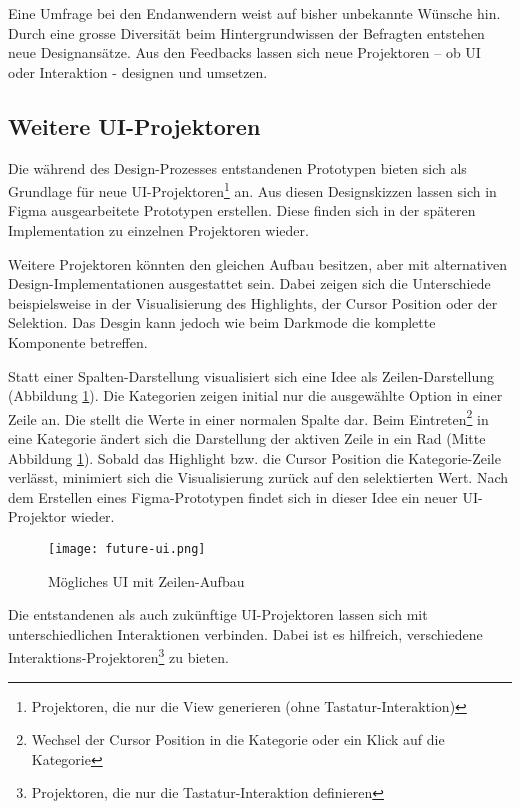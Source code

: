Eine Umfrage bei den Endanwendern weist auf bisher unbekannte Wünsche hin. 
Durch eine grosse Diversität beim Hintergrundwissen der Befragten entstehen neue Designansätze.
Aus den Feedbacks lassen sich neue Projektoren – ob UI oder Interaktion - designen und umsetzen.


\subsection{Weitere UI-Projektoren}
\label{sec:moreUi}

Die während des Design-Prozesses entstandenen Prototypen bieten sich als Grundlage für neue UI-Projektoren\footnote{
    Projektoren, die nur die View generieren (ohne Tastatur-Interaktion)
} an.
Aus diesen Designskizzen lassen sich in Figma ausgearbeitete Prototypen erstellen.
Diese finden sich in der späteren Implementation zu einzelnen Projektoren wieder.

Weitere Projektoren könnten den gleichen Aufbau besitzen, aber mit alternativen Design-Implementationen ausgestattet sein.
Dabei zeigen sich die Unterschiede beispielsweise in der Visualisierung des Highlights, der Cursor Position oder der Selektion.
Das Desgin kann jedoch wie beim Darkmode die komplette Komponente betreffen.

Statt einer Spalten-Darstellung visualisiert sich eine Idee als Zeilen-Darstellung (Abbildung \ref{img:futureUi}). 
Die Kategorien zeigen initial nur die ausgewählte Option in einer Zeile an.
Die  stellt die Werte in einer normalen Spalte dar.
Beim Eintreten\footnote{
    Wechsel der Cursor Position in die Kategorie oder ein Klick auf die Kategorie
} in eine Kategorie ändert sich die Darstellung der aktiven Zeile in ein Rad (Mitte Abbildung \ref{img:futureUi}).
Sobald das Highlight bzw. die Cursor Position die Kategorie-Zeile verlässt, minimiert sich die Visualisierung zurück auf den selektierten Wert.
Nach dem Erstellen eines Figma-Prototypen findet sich in dieser Idee ein neuer UI-Projektor wieder.

\begin{figure}[!htb]
    \centering
    \texttt{[image: future-ui.png]}
    \caption{Mögliches UI mit Zeilen-Aufbau}
    \label{img:futureUi}
\end{figure}

Die entstandenen als auch zukünftige UI-Projektoren lassen sich mit unterschiedlichen Interaktionen verbinden.
Dabei ist es hilfreich, verschiedene Interaktions-Projektoren\footnote{
    Projektoren, die nur die Tastatur-Interaktion definieren
} zu bieten.


